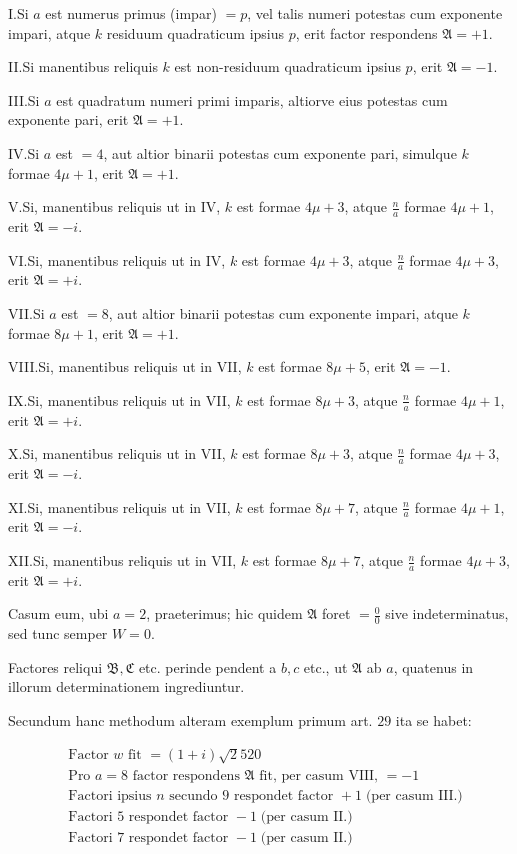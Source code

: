 I.\quad Si $a$ est numerus primus (impar) $=p$, vel talis numeri potestas cum exponente impari, atque $k$ residuum quadraticum ipsius $p$, erit factor respondens $\mathfrak A=+1$.

II.\quad Si manentibus reliquis $k$ est non-residuum quadraticum ipsius $p$, erit $\mathfrak A=-1$.

III.\quad Si $a$ est quadratum numeri primi imparis, altiorve eius potestas cum exponente pari, erit $\mathfrak A=+1$.

IV.\quad Si $a$ est $=4$, aut altior binarii potestas cum exponente pari, simulque $k$ formae $4\mu+1$, erit $\mathfrak A=+1$.

V.\quad Si, manentibus reliquis ut in IV, $k$ est formae $4\mu+3$, atque $\frac{n}{a}$ formae $4\mu+1$, erit $\mathfrak A=-i$.

VI.\quad Si, manentibus reliquis ut in IV, $k$ est formae $4\mu+3$, atque $\frac{n}{a}$ formae $4\mu+3$, erit $\mathfrak A=+i$.

VII.\quad Si $a$ est $=8$, aut altior binarii potestas cum exponente impari, atque $k$ formae $8\mu+1$, erit $\mathfrak A=+1$.

VIII.\quad Si, manentibus reliquis ut in VII, $k$ est formae $8\mu+5$, erit $\mathfrak A=-1$.

IX.\quad Si, manentibus reliquis ut in VII, $k$ est formae $8\mu+3$, atque $\frac{n}{a}$ formae $4\mu+1$, erit $\mathfrak A=+i$.


X.\quad Si, manentibus reliquis ut in VII, $k$ est formae $8\mu+3$, atque $\frac{n}{a}$ formae $4\mu+3$, erit $\mathfrak A=-i$.

XI.\quad Si, manentibus reliquis ut in VII, $k$ est formae $8\mu+7$, atque $\frac{n}{a}$ formae $4\mu+1$, erit $\mathfrak A=-i$.

XII.\quad Si, manentibus reliquis ut in VII, $k$ est formae $8\mu+7$, atque $\frac{n}{a}$ formae $4\mu+3$, erit $\mathfrak A=+i$.

Casum eum, ubi $a=2$, praeterimus; hic quidem $\mathfrak A$ foret $=\frac00$ sive indeterminatus, sed tunc semper $W=0$.

Factores reliqui $\mathfrak B,\mathfrak C$ etc. perinde pendent a $b,c$ etc., ut $\mathfrak A$ ab $a$, quatenus in illorum determinationem ingrediuntur.


Secundum hanc methodum alteram exemplum primum art. $29$ ita se habet:

{\small
\[
\begin{aligned}
&\text{Factor }w\text{ fit }=(1+i)\surd2520\\
&\text{Pro }a=8\text{ factor respondens }\mathfrak A\text{ fit, per casum VIII, }=-1\\
&\text{Factori ipsius }n\text{ secundo }9\text{ respondet factor }+1\;\text{(per casum III.)}\\
&\text{Factori }5\text{ respondet factor }-1\;\text{(per casum II.)}\\
&\text{Factori }7\text{ respondet factor }-1\;\text{(per casum II.)}
\end{aligned}
\]
}

